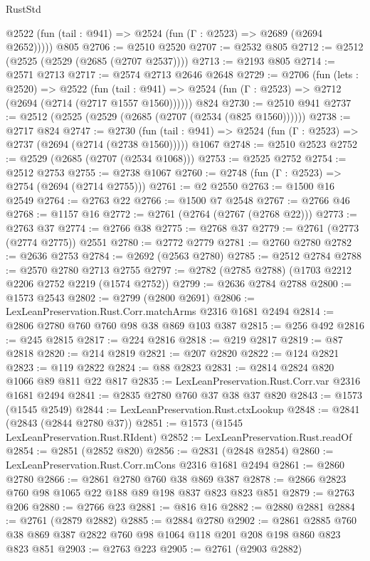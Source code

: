 \begin{lexlean}{RustStd}
\begin{coremodule}
      @2522 (fun (tail : @941) => @2524 (fun (Γ : @2523) => @2689 (@2694 @2652)))))
    @805
@2706 := @2510 @2520
@2707 := @2532 @805
@2712 := @2512 (@2525 (@2529 (@2685 (@2707 @2537))))
@2713 := @2193 @805
@2714 := @2571 @2713
@2717 := @2574 @2713 @2646 @2648
@2729 := @2706
    (fun (lets : @2520) =>
    @2522
      (fun (tail : @941) => @2524 (fun (Γ : @2523) => @2712 (@2694 (@2714 (@2717 @1557 @1560))))))
    @824
@2730 := @2510 @941
@2737 := @2512 (@2525 (@2529 (@2685 (@2707 (@2534 (@825 @1560))))))
@2738 := @2717 @824
@2747 := @2730
    (fun (tail : @941) => @2524 (fun (Γ : @2523) => @2737 (@2694 (@2714 (@2738 @1560)))))
    @1067
@2748 := @2510 @2523
@2752 := @2529 (@2685 (@2707 (@2534 @1068)))
@2753 := @2525 @2752
@2754 := @2512 @2753
@2755 := @2738 @1067
@2760 := @2748 (fun (Γ : @2523) => @2754 (@2694 (@2714 @2755)))
@2761 := @2 @2550
@2763 := @1500 @16 @2549
@2764 := @2763 @22
@2766 := @1500 @7 @2548
@2767 := @2766 @46
@2768 := @1157 @16
@2772 := @2761 (@2764 (@2767 (@2768 @22)))
@2773 := @2763 @37
@2774 := @2766 @38
@2775 := @2768 @37
@2779 := @2761 (@2773 (@2774 @2775)) @2551
@2780 := @2772 @2779
@2781 := @2760 @2780
@2782 := @2636 @2753
@2784 := @2692 (@2563 @2780)
@2785 := @2512 @2784
@2788 := @2570 @2780 @2713 @2755
@2797 := @2782 (@2785 @2788) (@1703 @2212 @2206 @2752 @2219 (@1574 @2752))
@2799 := @2636 @2784 @2788
@2800 := @1573 @2543
@2802 := @2799 (@2800 @2691)
@2806 := LexLeanPreservation.Rust.Corr.matchArms @2316 @1681 @2494
@2814 := @2806 @2780 @760 @760 @98 @38 @869 @103 @387
@2815 := @256 @492
@2816 := @245 @2815
@2817 := @224 @2816
@2818 := @219 @2817
@2819 := @87 @2818
@2820 := @214 @2819
@2821 := @207 @2820
@2822 := @124 @2821
@2823 := @119 @2822
@2824 := @88 @2823
@2831 := @2814 @2824 @820 @1066 @89 @811 @22 @817
@2835 := LexLeanPreservation.Rust.Corr.var @2316 @1681 @2494
@2841 := @2835 @2780 @760 @37 @38 @37 @820
@2843 := @1573 (@1545 @2549)
@2844 := LexLeanPreservation.Rust.ctxLookup
@2848 := @2841 (@2843 (@2844 @2780 @37))
@2851 := @1573 (@1545 LexLeanPreservation.Rust.RIdent)
@2852 := LexLeanPreservation.Rust.readOf
@2854 := @2851 (@2852 @820)
@2856 := @2831 (@2848 @2854)
@2860 := LexLeanPreservation.Rust.Corr.mCons @2316 @1681 @2494
@2861 := @2860 @2780
@2866 := @2861 @2780 @760 @38 @869 @387
@2878 := @2866 @2823 @760 @98 @1065 @22 @188 @89 @198 @837 @823 @823 @851
@2879 := @2763 @206
@2880 := @2766 @23
@2881 := @816 @16
@2882 := @2880 @2881
@2884 := @2761 (@2879 @2882)
@2885 := @2884 @2780
@2902 := @2861 @2885 @760 @38 @869 @387 @2822 @760 @98 @1064 @118 @201 @208 @198 @860 @823 @823 @851
@2903 := @2763 @223
@2905 := @2761 (@2903 @2882)

\end{coremodule}
\end{lexlean}
